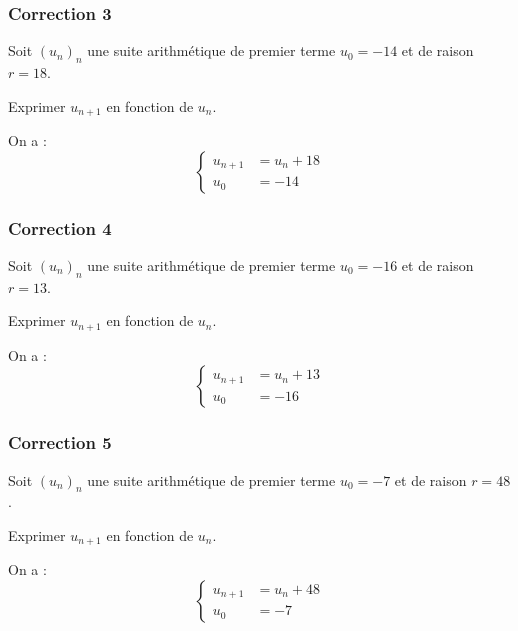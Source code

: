 \documentclass[15pt, mathserif]{beamer}
\begin{document}
\begin{frame}
\vspace{-10mm}
	\frametitle{Correction 3}
Soit $(u_n)_n$ une suite arithmétique de premier terme $u_0=-14$ et de raison $r=18$. 
 
 Exprimer $u_{n+1}$ en fonction de $u_n$. 
 
 On a : $$ \left\{ 
 \begin{array}{ll} 
 u_{n+1} &= u_n +18 \\ 
 u_0 & = -14 
 \end{array} 
 \right. $$ 
 \end{frame}


\begin{frame}
\vspace{-10mm}
	\frametitle{Correction 4}
Soit $(u_n)_n$ une suite arithmétique de premier terme $u_0=-16$ et de raison $r=13$. 
 
 Exprimer $u_{n+1}$ en fonction de $u_n$. 
 
 On a : $$ \left\{ 
 \begin{array}{ll} 
 u_{n+1} &= u_n +13 \\ 
 u_0 & = -16 
 \end{array} 
 \right. $$ 
 \end{frame}


\begin{frame}
\vspace{-10mm}
	\frametitle{Correction 5}
Soit $(u_n)_n$ une suite arithmétique de premier terme $u_0=-7$ et de raison $r=48$. 
 
 Exprimer $u_{n+1}$ en fonction de $u_n$. 
 
 On a : $$ \left\{ 
 \begin{array}{ll} 
 u_{n+1} &= u_n +48 \\ 
 u_0 & = -7 
 \end{array} 
 \right. $$ 
 \end{frame}
\end{document}
